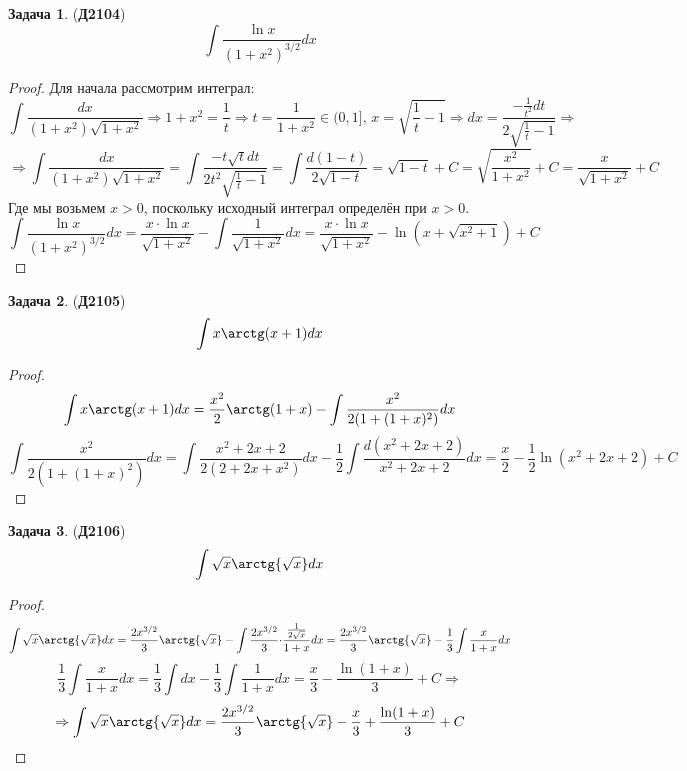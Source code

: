 \documentclass[12pt]{article}
\theoremstyle{definition}
\newtheorem{problem}{Задача}
\DeclareMathOperator{\dint}{\displaystyle\int}
\begin{document}
\begin{problem}(\textbf{Д2104})
	$$
		\dint \dfrac{\ln{x}}{(1 + x^2)^{3/2}}dx
	$$
\end{problem}
\begin{proof}
	Для начала рассмотрим интеграл:
	$$
		\dint \dfrac{dx}{(1 +x^2)\sqrt{1 +x^2}} \Rightarrow 1 + x^2 = \dfrac{1}{t} \Rightarrow t = \dfrac{1}{1 + x^2} \in (0,1], \, x = \sqrt{\dfrac{1}{t} - 1} \Rightarrow dx = \dfrac{-\tfrac{1}{t^2}dt}{2\sqrt{\tfrac{1}{t} - 1}} \Rightarrow
	$$
	$$
		\Rightarrow 	\dint \dfrac{dx}{(1 +x^2)\sqrt{1 +x^2}} = \dint \dfrac{-t\sqrt{t}dt}{2t^2\sqrt{\tfrac{1}{t}- 1}} = \dint \dfrac{d(1-t)}{2\sqrt{1 - t}} = \sqrt{1-t} + C = \sqrt{\dfrac{x^2}{1+x^2}} + C = \dfrac{x}{\sqrt{1 + x^2}} + C
	$$
	Где мы возьмем $x > 0$, поскольку исходный интеграл определён при $x > 0$.
	$$
		\dint \dfrac{\ln{x}}{(1 + x^2)^{3/2}}dx = \dfrac{x{\cdot}\ln{x}}{\sqrt{1 + x^2}} - \dint \dfrac{1}{\sqrt{1 + x^2}}dx = \dfrac{x{\cdot}\ln{x}}{\sqrt{1 + x^2}} - \ln(x + \sqrt{x^2 + 1}) + C
	$$
\end{proof}
\begin{problem}(\textbf{Д2105})
	$$
		\dint x\arctg(x+ 1)dx
	$$
\end{problem}
\begin{proof}
	$$
		\dint x\arctg(x+ 1)dx = \dfrac{x^2}{2}\arctg(1 + x) - \dint \dfrac{x^2}{2(1 + (1 + x)^2)}dx
	$$
	$$
		\dint \dfrac{x^2}{2(1 + (1 + x)^2)}dx = \dint \dfrac{x^2 + 2x + 2}{2(2 + 2x + x^2)}dx  - \dfrac{1}{2}\dint\dfrac{d(x^2 + 2x + 2)}{x^2 + 2x + 2}dx = \dfrac{x}{2} - \dfrac{1}{2}\ln(x^2 + 2x + 2) + C
	$$
\end{proof}
\begin{problem}(\textbf{Д2106})
	$$
		\dint \sqrt{x}\arctg{\sqrt{x}}dx
	$$
\end{problem}
\begin{proof}
	$$
		\dint \sqrt{x}\arctg{\sqrt{x}}dx = \dfrac{2x^{3/2}}{3}\arctg{\sqrt{x}} - \dint \dfrac{2x^{3/2}}{3}{\cdot}\dfrac{\tfrac{1}{2\sqrt{x}}}{1 + x}dx = \dfrac{2x^{3/2}}{3}\arctg{\sqrt{x}} - \dfrac{1}{3}\dint \dfrac{x}{1 + x}dx 
	$$
	$$
		\dfrac{1}{3}\dint \dfrac{x}{1 + x}dx  = \dfrac{1}{3}\dint dx - \dfrac{1}{3}\dint \dfrac{1}{1 + x}dx = \dfrac{x}{3} - \dfrac{\ln(1+x)}{3} + C \Rightarrow
	$$
	$$
		\Rightarrow \dint \sqrt{x}\arctg{\sqrt{x}}dx = \dfrac{2x^{3/2}}{3}\arctg{\sqrt{x}}- \dfrac{x}{3} + \dfrac{\ln(1+x)}{3} + C
	$$
\end{proof}
\end{document}

